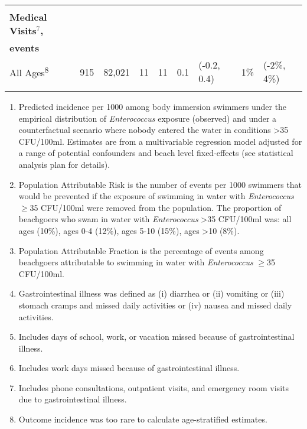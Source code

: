 \documentclass[12pt]{article}\usepackage[]{graphicx}\usepackage[]{color}
\begin{document}
\begin{table}[h!tb]
\begin{footnotesize}
\begin{center}
\begin{tabular}{l rr cc rl rl}
& \\
\textbf{Medical Visits$^7$,} \\
\textbf{events} \\
 All Ages\textsuperscript{8} & 915 & 82,021 & 11 & 11 & 0.1 & (-0.2, 0.4) & 1\% & (-2\%, 4\%) \\ 
  
& \\
\hline
\end{tabular}
\end{center}
\end{footnotesize}
\begin{scriptsize}
\begin{minipage}{\textwidth}
\begin{enumerate}
  \setlength{\itemsep}{1pt}
  \item Predicted incidence per 1000 among body immersion swimmers under the empirical distribution of \textit{Enterococcus} exposure (observed) and under a counterfactual scenario where nobody entered the water in conditions >35 CFU/100ml. Estimates are from a multivariable regression model adjusted for a range of potential confounders and beach level fixed-effects (see statistical analysis plan for details).
  \item Population Attributable Risk is the number of events per 1000 swimmers that would be prevented if the exposure of swimming in water with \textit{Enterococcus} $\geq$35 CFU/100ml were removed from the population. The proportion of beachgoers who swam in water with \textit{Enterococcus} >35 CFU/100ml was: all ages (10\%), ages 0-4 (12\%), ages 5-10 (15\%), ages >10 (8\%). 
  \item Population Attributable Fraction is the percentage of events among beachgoers attributable to swimming in water with \textit{Enterococcus} $\geq$35 CFU/100ml.
  \item Gastrointestinal illness was defined as (i) diarrhea or (ii) vomiting or (iii) stomach cramps and missed daily activities or (iv) nausea and missed daily activities.
  \item Includes days of school, work, or vacation missed because of gastrointestinal illness.
  \item Includes work days missed because of gastrointestinal illness.
  \item Includes phone consultations, outpatient visits, and emergency room visits due to gastrointestinal illness. 
  \item Outcome incidence was too rare to calculate age-stratified estimates.
\end{enumerate}
\end{minipage}
\end{scriptsize}
\end{table}
\end{document}
